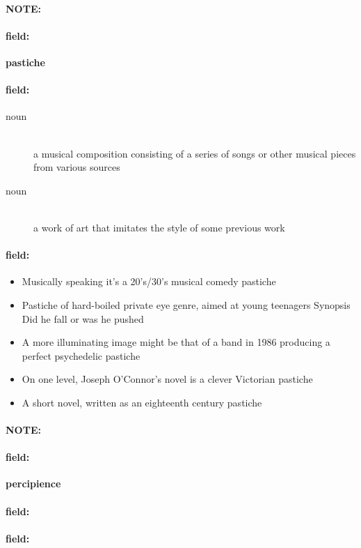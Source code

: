 \documentclass[12pt]{article}
\newenvironment{note}{\paragraph{NOTE:}}{}
\newenvironment{field}{\paragraph{field:}}{}
\begin{document}
\begin{note}
\begin{field}
\textbf{\large pastiche}
\end{field}


\begin{field}
\begin{description}
\item[noun] \hfill \\ 
a musical composition consisting of a series of songs or other musical pieces from various sources

\item[noun] \hfill \\ 
a work of art that imitates the style of some previous work

\end{description}
\end{field}

\begin{field}
\begin{itemize}
\item Musically speaking it's a 20's/30's musical comedy pastiche
\item Pastiche of hard-boiled private eye genre, aimed at young teenagers Synopsis Did he fall or was he pushed
\item A more illuminating image might be that of a band in 1986 producing a perfect psychedelic pastiche
\item On one level, Joseph O'Connor's novel is a clever Victorian pastiche
\item A short novel, written as an eighteenth century pastiche
\end{itemize}
\end{field}
\end{note}
\begin{note}
\begin{field}
\textbf{\large percipience}
\end{field}


\begin{field}
\end{field}

\begin{field}
\end{field}
\end{note}
\end{document}
